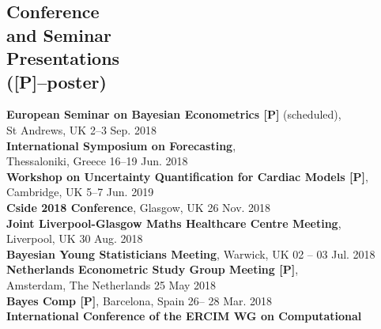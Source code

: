 \documentclass[margin,line]{resume}
\begin{document}
\begin{resume}
\vspace{-4mm}





 \newpage	

\section{\mysidestyle Conference \\and Seminar \\Presentations \\ ([P]--poster)} 
	\textbf{ European Seminar on Bayesian Econometrics [P]} (scheduled),\\
	St Andrews, UK \hfill 2--3 Sep. 2018 \vspace{1mm} \\	
	\textbf{ International Symposium on Forecasting},\\
	Thessaloniki, Greece \hfill 16--19 Jun. 2018 \vspace{1mm} \\	
	\textbf{Workshop on Uncertainty Quantification for Cardiac Models [P]},\\
	Cambridge, UK \hfill 5--7 Jun. 2019 \vspace{1mm} \\		
	\textbf{Cside 2018 Conference}, Glasgow, UK \hfill 26 Nov. 2018 \vspace{1mm} \\
	\textbf{ Joint Liverpool-Glasgow Maths Healthcare Centre Meeting},\\
	Liverpool, UK \hfill 30 Aug. 2018 \vspace{1mm} \\	
	\textbf{ Bayesian Young Statisticians Meeting}, Warwick, UK \hfill 02 -- 03 Jul. 2018 \vspace{1mm} \\
	\textbf{ Netherlands Econometric Study Group Meeting [P]}, \\
	Amsterdam, The Netherlands \hfill 25 May 2018  \vspace{1mm} \\ 
	\textbf{ Bayes Comp [P]}, Barcelona, Spain \hfill 26-- 28 Mar. 2018 \vspace{1mm} \\
	\textbf{ International Conference of the ERCIM WG on Computational}\\

\end{resume}
\end{document}
